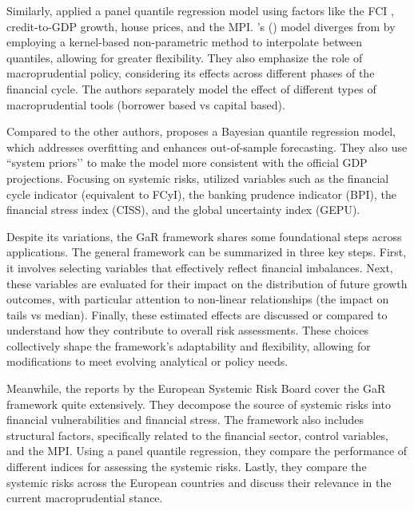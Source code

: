 Similarly, \citet{galan2020} applied a panel quantile regression model using factors like the FCI \citet{koop_2013}, credit-to-GDP growth, house prices, and the MPI. \citeauthor{galan2020}'s (\citeyear{galan2020}) model diverges from \citet{adrian_2019} by employing a kernel-based non-parametric method to interpolate between quantiles, allowing for greater flexibility. They also emphasize the role of macroprudential policy, considering its effects across different phases of the financial cycle. The authors separately model the effect of different types of macroprudential tools (borrower based vs capital based).

Compared to the other authors, \citet{szabo2020} proposes a Bayesian quantile regression model, which addresses overfitting and enhances out-of-sample forecasting. They also use ``system priors’’ to make the model more consistent with the official GDP projections. Focusing on systemic risks, \citet{szabo2020} utilized variables such as the financial cycle indicator (equivalent to FCyI), the banking prudence indicator (BPI), the financial stress index (CISS), and the global uncertainty index (GEPU).

Despite its variations, the GaR framework shares some foundational steps across applications. The general framework can be summarized in three key steps. First, it involves selecting variables that effectively reflect financial imbalances. Next, these variables are evaluated for their impact on the distribution of future growth outcomes, with particular attention to non-linear relationships (the impact on tails vs median). Finally, these estimated effects are discussed or compared to understand how they contribute to overall risk assessments. These choices collectively shape the framework's adaptability and flexibility, allowing for modifications to meet evolving analytical or policy needs.

Meanwhile, the reports by the European Systemic Risk Board \citep{esrb2018, esrb2019, esrb2021, esrb2024} cover the GaR framework quite extensively. They decompose the source of systemic risks into financial vulnerabilities and financial stress. The framework also includes structural factors, specifically related to the financial sector, control variables, and the MPI. Using a panel quantile regression, they compare the performance of different indices for assessing the systemic risks. Lastly, they compare the systemic risks across the European countries and discuss their relevance in the current macroprudential stance.

